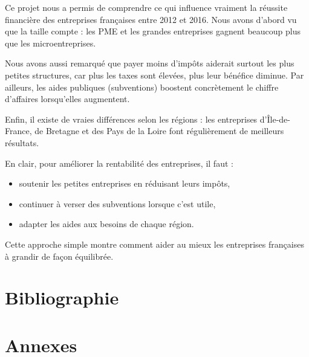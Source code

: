 \documentclass[mstat,12pt]{unswthesis}
\begin{document}
\medskip

Ce projet nous a permis de comprendre ce qui influence vraiment la
réussite financière des entreprises françaises entre 2012 et 2016. Nous
avons d'abord vu que la taille compte : les PME et les grandes
entreprises gagnent beaucoup plus que les microentreprises.

\medskip

Nous avons aussi remarqué que payer moins d'impôts aiderait surtout les
plus petites structures, car plus les taxes sont élevées, plus leur
bénéfice diminue. Par ailleurs, les aides publiques (subventions)
boostent concrètement le chiffre d'affaires lorsqu'elles augmentent.

\medskip

Enfin, il existe de vraies différences selon les régions : les
entreprises d'Île-de-France, de Bretagne et des Pays de la Loire font
régulièrement de meilleurs résultats.

\medskip

En clair, pour améliorer la rentabilité des entreprises, il faut :

\begin{itemize}
\item
  soutenir les petites entreprises en réduisant leurs impôts,
\item
  continuer à verser des subventions lorsque c'est utile,
\item
  adapter les aides aux besoins de chaque région.
\end{itemize}

\medskip

Cette approche simple montre comment aider au mieux les entreprises
françaises à grandir de façon équilibrée.

\chapter*{Bibliographie}\label{bibliographie}

\label{refs}
\begin{CSLReferences}{0}{1}
\end{CSLReferences}




\chapter*{Annexes}\label{annexes}
\end{document}
